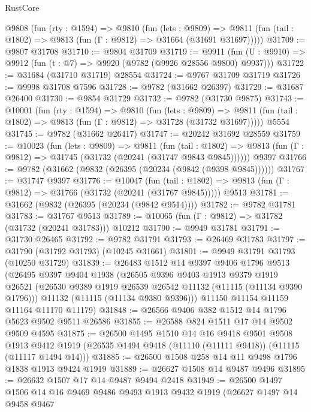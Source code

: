 \begin{lexlean}{RustCore}
\begin{coremodule}
  @9808
    (fun (rty : @1594) =>
    @9810
      (fun (lets : @9809) =>
      @9811 (fun (tail : @1802) => @9813 (fun (Γ : @9812) => @31664 (@31691 @31697)))))
@31709 := @9807 @31708
@31710 := @9804 @31709
@31719 := @9911
    (fun (U : @9910) => @9912 (fun (t : @7) => @9920 (@9782 (@9926 @28556 @9800) @9937)))
@31722 := @31684 (@31710 @31719) @28554
@31724 := @9767 @31709 @31719
@31726 := @9998 @31708 @7596
@31728 := @9782 (@31662 @26397)
@31729 := @31687 @26400
@31730 := @9854 @31729
@31732 := @9782 (@31730 @9875)
@31743 := @10001
    (fun (rty : @1594) =>
    @9810
      (fun (lets : @9809) =>
      @9811 (fun (tail : @1802) => @9813 (fun (Γ : @9812) => @31728 (@31732 @31697)))))
    @5554
@31745 := @9782 (@31662 @26417)
@31747 := @20242 @31692 @28559
@31759 := @10023
    (fun (lets : @9809) =>
    @9811
      (fun (tail : @1802) =>
      @9813 (fun (Γ : @9812) => @31745 (@31732 (@20241 (@31747 @9843 @9845))))))
    @9397
@31766 := @9782 (@31662 (@9832 (@26395 (@20234 (@9842 (@9398 @9845))))))
@31767 := @31747 @9397
@31776 := @10047
    (fun (tail : @1802) => @9813 (fun (Γ : @9812) => @31766 (@31732 (@20241 (@31767 @9845)))))
    @9513
@31781 := @31662 (@9832 (@26395 (@20234 (@9842 @9514))))
@31782 := @9782 @31781
@31783 := @31767 @9513
@31789 := @10065 (fun (Γ : @9812) => @31782 (@31732 (@20241 @31783))) @10212
@31790 := @9949 @31781
@31791 := @31730 @26465
@31792 := @9782 @31791
@31793 := @26469 @31783
@31797 := @31790 (@31792 @31793) (@10245 @31661)
@31801 := @9949 @31791 @31793 (@10250 @31729)
@31839 := @26483
    @1512
    @14
    @9397
    @9406
    @1796
    @9513
    (@26495
      @9397
      @9404
      @1938
      (@26505
        @9396
        @9403
        @1913
        @9379
        @1919
        @26521
        (@26530 @9389 @1919 @26539 @26542 @11132 (@11115 (@11134 @9390 @1796)))
        @11132
        (@11115 (@11134 @9380 @9396)))
      @11150
      @11154
      @11159
      @11164
      @11170
      @11179)
@31848 := @26566 @9406 @382 @1512 @14 @1796 @5623 @9502 @9511 @26586
@31855 := @26588 @824 @1511 @17 @14 @9502 @9509 @4595
@31875 := @26500
    @1495
    @1510
    @14
    @16
    @9418
    @9501
    @9508
    @1913
    @9412
    @1919
    (@26535 @1494 @9418 (@11110 (@11111 @9418)) (@11115 (@11117 @1494 @14)))
@31885 := @26500 @1508 @258 @14 @11 @9498 @1796 @1838 @1913 @9424 @1919
@31889 := @26627 @1508 @14 @9487 @9496
@31895 := @26632 @1507 @17 @14 @9487 @9494 @2418
@31949 := @26500
    @1497
    @1506
    @14
    @16
    @9469
    @9486
    @9493
    @1913
    @9432
    @1919
    (@26627
      @1497
      @14
      @9458
      @9467

\end{coremodule}
\end{lexlean}
